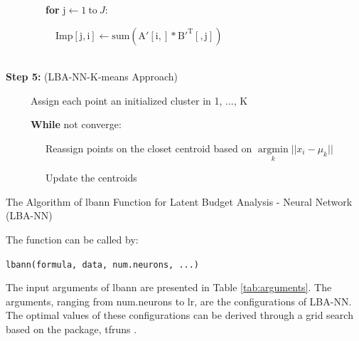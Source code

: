 \documentclass[]{interact}
\theoremstyle{plain}%
\theoremstyle{definition}
\theoremstyle{remark}
\begin{document}
\begin{minipage}{0.90\textwidth}
\begin{algorithm}[H]
        \ \ \ \ \ \ \ \ \textbf{for} $\mathrm{j} \leftarrow 1 \: \mathrm{to} \: J$:

        \ \ \ \ \ \ \ \  \ \ $\mathrm{Imp[j, i]} \leftarrow \mathrm{sum(A'[i, ] * B'^T[ ,j])}$
            
     \hspace*{\fill} \\
     \textbf{Step 5:} (LBA-NN-K-means Approach)
            
        \ \ \ \ \ Assign each point an initialized cluster in {1, ..., K}
        
        \ \ \ \ \ \textbf{While} not converge:
        
        \ \ \ \ \ \ \ \ Reassign points on the closet centroid based on $\underset{k}{\operatorname{argmin}} ||x_i - \mu_k||$
        
        \ \ \ \ \ \ \ \ Update the centroids

\caption{The Algorithm of \textsf{lbann} Function for Latent Budget Analysis - Neural Network (LBA-NN)}
\end{algorithm}
\end{minipage}
\bigskip

The function can be called by:

\texttt{lbann(formula,\ data,\ num.neurons,\ ...)}

The input arguments of \textsf{lbann} are presented in Table
\ref{tab:arguments}. The arguments, ranging from \textsf{num.neurons} to
\textsf{lr}, are the configurations of LBA-NN. The optimal values of
these configurations can be derived through a grid search
\citep{yang1994} based on the package, \textsf{tfruns} \citep{tfruns}.
\end{document}
